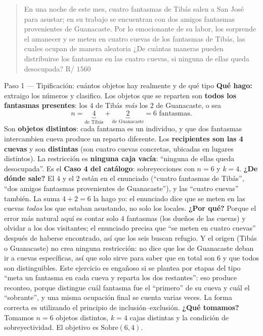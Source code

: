 \documentclass[11pt]{article}
\begin{document}
\begin{quote}
En una noche de este mes, cuatro fantasmas de Tibás salen a San José para asustar; en su trabajo se encuentran con dos amigos fantasmas provenientes de Guanacaste. Por lo emocionante de su labor, los sorprende el amanecer y se meten en cuatro cuevas de los fantasmas de Tibás, las cuales ocupan de manera aleatoria ¿De cuántas maneras pueden distribuirse los fantasmas en las cuatro cuevas, si ninguna de ellas queda desocupada? \hfill R/ $1560$
\end{quote}

\begin{sol}

\begin{paso}{Paso 1 --- Tipificación: cuántos objetos hay realmente y de qué tipo}
\textbf{Qué hago:} extraigo los números y clasifico. Los objetos que se reparten son \textbf{todos los fantasmas presentes}: los $4$ de Tibás \emph{más} los $2$ de Guanacaste, o sea
\[
n=\underbrace{4}_{\text{de Tibás}}+\underbrace{2}_{\text{de Guanacaste}}=6 \text{ fantasmas}.
\]
Son \textbf{objetos distintos}: cada fantasma es un individuo, y que dos fantasmas intercambien cueva produce un reparto diferente. Los \textbf{recipientes son las 4 cuevas} y son \textbf{distintas} (son cuatro cuevas concretas, ubicadas en lugares distintos). La restricción es \textbf{ninguna caja vacía}: ``ninguna de ellas queda desocupada''. Es el \textbf{Caso 4 del catálogo}: sobreyecciones con $n=6$ y $k=4$.
\textbf{¿De dónde sale?} El $4$ y el $2$ están en el enunciado (``cuatro fantasmas de Tibás'', ``dos amigos fantasmas provenientes de Guanacaste''), y las ``cuatro cuevas'' también. La suma $4+2=6$ la hago yo: el enunciado dice que se meten en las cuevas \emph{todos} los que estaban asustando, no solo los locales.
\textbf{¿Por qué?} Porque el error más natural aquí es contar solo $4$ fantasmas (los dueños de las cuevas) y olvidar a los dos visitantes; el enunciado precisa que ``se meten en cuatro cuevas'' después de haberse encontrado, así que los seis buscan refugio. Y el origen (Tibás o Guanacaste) no crea ninguna restricción: no dice que los de Guanacaste deban ir a cuevas específicas, así que solo sirve para saber que en total son $6$ y que todos son distinguibles. Este ejercicio es engañoso si se plantea por etapas del tipo ``meta un fantasma en cada cueva y reparta los dos restantes'': eso produce reconteo, porque distingue cuál fantasma fue el ``primero'' de su cueva y cuál el ``sobrante'', y una misma ocupación final se cuenta varias veces. La forma correcta es utilizando el principio de inclusión--exclusión.
\textbf{¿Qué tomamos?} Tomamos $n=6$ objetos distintos, $k=4$ cajas distintas y la condición de sobreyectividad. El objetivo es $\text{Sobre}(6,4)$.
\end{paso}


\end{sol}
\end{document}
